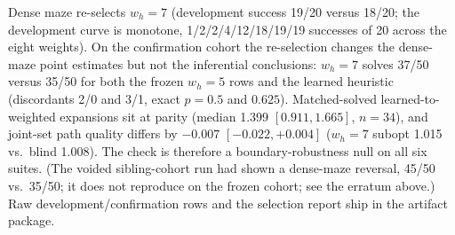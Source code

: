 \documentclass[letterpaper]{article} %
\begin{document}
Dense maze re-selects $w_h{=}7$ (development success 19/20 versus 18/20; the development curve is monotone, 1/2/2/4/12/18/19/19 successes of 20 across the eight weights). On the confirmation cohort the re-selection changes the dense-maze point estimates but not the inferential conclusions: $w_h{=}7$ solves 37/50 versus 35/50 for both the frozen $w_h{=}5$ rows and the learned heuristic (discordants 2/0 and 3/1, exact $p{=}0.5$ and $0.625$). Matched-solved learned-to-weighted expansions sit at parity (median 1.399 $[0.911, 1.665]$, $n{=}34$), and joint-set path quality differs by $-0.007$ $[-0.022, +0.004]$ ($w_h{=}7$ subopt 1.015 vs.\ blind 1.008). The check is therefore a boundary-robustness null on all six suites. (The voided sibling-cohort run had shown a dense-maze reversal, 45/50 vs.\ 35/50; it does not reproduce on the frozen cohort; see the erratum above.) Raw development/confirmation rows and the selection report ship in the artifact package.
\end{document}
